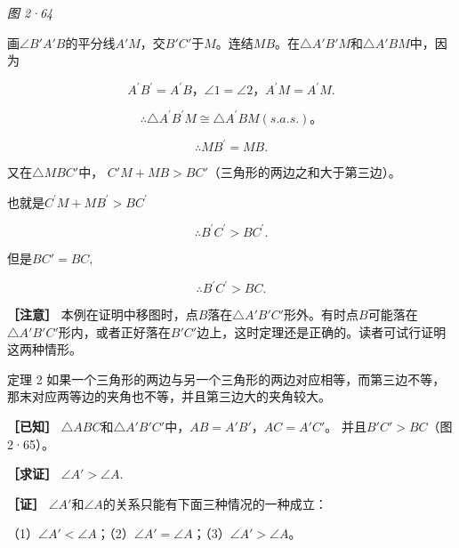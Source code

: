 \emph{图 2·64}

画\(\angle B'A'B\)的平分线\(A'M\)，交\(B'C'\)于\(M\)。连结\(MB\)。在\(\triangle A'B'M\)和\(\triangle A'BM\)中，因为

\[
A ^{\prime} B ^{\prime} = A ^{\prime} B\text{，} \angle 1 = \angle 2\text{，} A ^{\prime} M = A ^{\prime} M.
\]

\[
\therefore \triangle A ^{\prime} B ^{\prime} M \cong \triangle A ^{\prime} BM (s. a. s.)\text{。}
\]

\[
\therefore MB ^{\prime} = MB.
\]

又在\(\triangle MBC'\)中，
\(C'M + MB > BC'\)（三角形的两边之和大于第三边）。

也就是\(C^{\prime}M + MB^{\prime} > BC^{\prime}\)

\[
\therefore B ^{\prime} C ^{\prime} > BC ^{\prime}.
\]

但是\(BC' = BC,\)

\[
\therefore B ^{\prime} C ^{\prime} > BC.
\]

\textbf{［注意］}
本例在证明中移图时，点\(B\)落在\(\triangle A'B'C'\)形外。有时点\(B\)可能落在\(\triangle A'B'C'\)形内，或者正好落在\(B'C'\)边上，这时定理还是正确的。读者可试行证明这两种情形。

定理 2
如果一个三角形的两边与另一个三角形的两边对应相等，而第三边不等，那末对应两等边的夹角也不等，并且第三边大的夹角较大。

\textbf{［已知］}
\(\triangle ABC\)和\(\triangle A'B'C'\)中，\(AB = A'B'\)，\(AC = A'C'\)。
并且\(B'C' > BC\)（图 2·65）。

\textbf{［求证］} \(\angle A' > \angle A.\)

\textbf{［证］}
\(\angle A'\)和\(\angle A\)的关系只能有下面三种情况的一种成立：

（1）\(\angle A' < \angle A\)；（2）\(\angle A' = \angle A\)；（3）\(\angle A' > \angle A\)。

